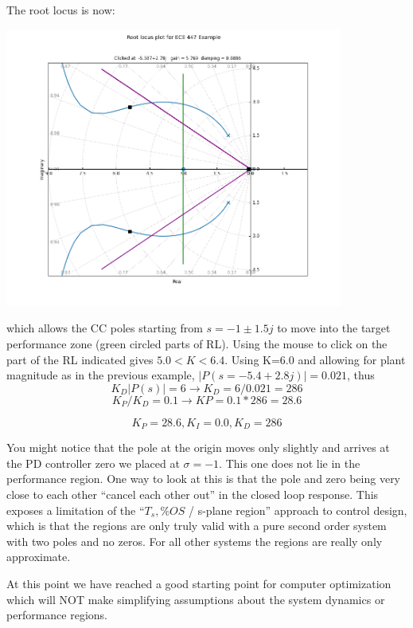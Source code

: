 \begin{ExampleCont}
The root locus is now:

\includegraphics[width=111mm]{figs09/R15J20.png}

which allows the CC poles starting from $s=-1\pm1.5j$ to move into the
target performance zone (green circled parts of RL).   Using the mouse to
click on the part of the RL indicated gives $5.0 < K < 6.4$.
Using K=6.0 and allowing for plant magnitude as in the previous example,
$|P(s=-5.4+2.8j)|=0.021$, thus
\[
K_D|P(s)| = 6 \to K_D = 6/0.021 = 286
\]
\[
K_P/K_D = 0.1\to KP = 0.1*286 = 28.6
\]

\[
K_P = 28.6, K_I = 0.0,  K_D = 286
\]

You might notice that the pole at the origin moves only slightly and arrives at the
PD controller zero we placed at $\sigma=-1$.  This one does not lie in the performance
region.  One way to look at this is that the pole and zero being very close to each other
``cancel each other out'' in the closed loop response.
This exposes a limitation of the ``$T_s, \%OS$ / s-plane region'' approach to control
design, which is that the regions are only truly valid with a pure second order system
with two poles and no zeros.  For all other systems the regions are really only approximate.

At this point we have reached a good starting point for computer optimization which
will NOT make simplifying assumptions about the system dynamics or performance regions.
\end{ExampleCont}





